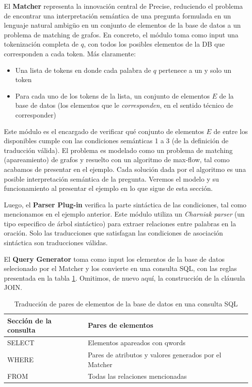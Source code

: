 El \textbf{Matcher} representa la innovación central de Precise, reduciendo el problema de encontrar una interpretación semántica de una pregunta formulada en un lenguaje natural ambigüo en un conjunto de elementos de la base de datos a un problema de matching de grafos. En concreto, el módulo toma como input una tokenización completa de $q$, con todos los posibles elementos de la DB que corresponden a cada token. Más claramente:
\begin{itemize}
  \item Una lista de tokens en donde cada palabra de $q$ pertenece a un y solo un token
  \item Para cada uno de los tokens de la lista, un conjunto de elementos $E$ de la base de datos (los elementos que le \textit{corresponden}, en el sentido técnico de corresponder)
\end{itemize}

Este módulo es el encargado de verificar qué conjunto de elementos $E$ de entre los disponibles cumple con las condiciones semánticas 1 a 3 (de la definición de traducción válida). El problema es modelado como un problema de matching (apareamiento) de grafos y resuelto con un algoritmo de max-flow, tal como acabamos de presentar en el ejemplo. Cada solución dada por el algoritmo es una posible interpretación semántica de la pregunta. Veremos el modelo y su funcionamiento al presentar el ejemplo en lo que sigue de esta sección.

Luego, el \textbf{Parser Plug-in} verifica la parte sintáctica de las condiciones, tal como mencionamos en el ejemplo anterior. Este módulo utiliza un \textit{Charniak parser} (un tipo especifico de árbol sintáctico) para extraer relaciones entre palabras en la oración. Solo las traducciones que satisfagan las condiciones de asociación sintáctica son traducciones válidas.

El \textbf{Query Generator} toma como input los elementos de la base de datos selecionado por el Matcher y los convierte en una consulta SQL, con las reglas presentada en la tabla \ref{table:db-to-sql}. Omitimos, de nuevo aquí, la construcción de la cláusula JOIN.


\begin{center}
\begin{table}[h]
\centering
\begin{tabular}{| l |  p{12cm} |}
\hline
Sección de la consulta & Pares de elementos \\ \hline
SELECT &  Elementos apareados con qwords \\ \hline
WHERE & Pares de atributos y valores generados por el Matcher\\ \hline
FROM & Todas las relaciones mencionadas \\ \hline
\end{tabular}
\caption{Traducción de pares de elementos de la base de datos en una consulta SQL}
\label{table:db-to-sql}
\end{table}
\end{center}

